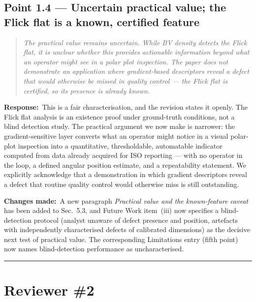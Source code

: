 \documentclass[11pt,a4paper]{article}
\newenvironment{reviewercomment}%
{\par\medskip\noindent\begin{quotation}\itshape\color{black!70}}%
{\end{quotation}\medskip}
\newcommand{\response}{\par\noindent\textbf{Response:}\ }
\newcommand{\changes}{\par\noindent\textbf{Changes made:}\ }
\begin{document}
\subsection*{Point 1.4 --- Uncertain practical value; the Flick flat is a known, certified feature}
\begin{reviewercomment}
The practical value remains uncertain. While BV density detects the Flick flat, it is unclear whether this provides actionable information beyond what an operator might see in a polar plot inspection. The paper does not demonstrate an application where gradient-based descriptors reveal a defect that would otherwise be missed in quality control --- the Flick flat is certified, so its presence is already known.
\end{reviewercomment}
\response This is a fair characterisation, and the revision states it openly. The Flick flat analysis is an existence proof under ground-truth conditions, not a blind detection study. The practical argument we now make is narrower: the gradient-sensitive layer converts what an operator might notice in a visual polar-plot inspection into a quantitative, thresholdable, automatable indicator computed from data already acquired for ISO reporting --- with no operator in the loop, a defined angular position estimate, and a repeatability statement. We explicitly acknowledge that a demonstration in which gradient descriptors reveal a defect that routine quality control would otherwise miss is still outstanding.
\changes A new paragraph \emph{Practical value and the known-feature caveat} has been added to Sec.~5.3, and Future Work item~(iii) now specifies a blind-detection protocol (analyst unaware of defect presence and position, artefacts with independently characterised defects of calibrated dimensions) as the decisive next test of practical value. The corresponding Limitations entry (fifth point) now names blind-detection performance as uncharacterised.

\bigskip
\hrule
\section*{Reviewer \#2}
\end{document}
